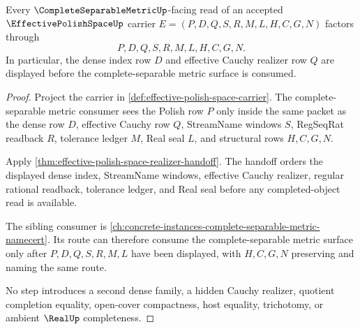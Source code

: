 \begin{theorem}\label{thm:effective-polish-space-complete-separable-handoff}
Every $\CompleteSeparableMetricUp$-facing read of an accepted $\EffectivePolishSpaceUp$ carrier $E=(P,D,Q,S,R,M,L,H,C,G,N)$ factors through
$$
P,D,Q,S,R,M,L,H,C,G,N .
$$
In particular, the dense index row $D$ and effective Cauchy realizer row $Q$ are displayed before the complete-separable metric surface is consumed.
\end{theorem}
\begin{proof}
Project the carrier in \autoref{def:effective-polish-space-carrier}. The complete-separable metric consumer sees the Polish row $P$ only inside the same packet as the dense row $D$, effective Cauchy row $Q$, StreamName windows $S$, RegSeqRat readback $R$, tolerance ledger $M$, Real seal $L$, and structural rows $H,C,G,N$.

Apply \autoref{thm:effective-polish-space-realizer-handoff}. The handoff orders the displayed dense index, StreamName windows, effective Cauchy realizer, regular rational readback, tolerance ledger, and Real seal before any completed-object read is available.

The sibling consumer is \autoref{ch:concrete-instances-complete-separable-metric-namecert}. Its route can therefore consume the complete-separable metric surface only after $P,D,Q,S,R,M,L$ have been displayed, with $H,C,G,N$ preserving and naming the same route.

No step introduces a second dense family, a hidden Cauchy realizer, quotient completion equality, open-cover compactness, host equality, trichotomy, or ambient $\RealUp$ completeness.
\end{proof}


